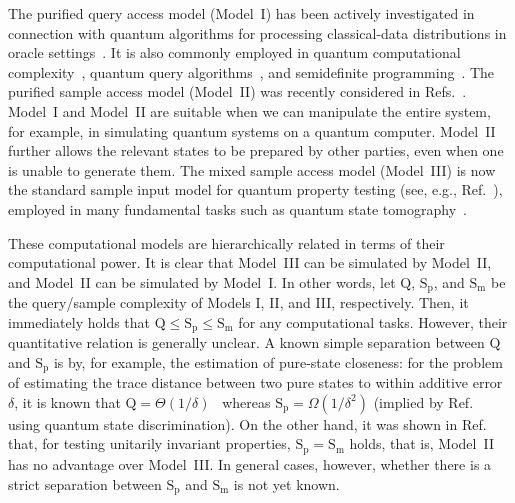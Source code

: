 The purified query access model (Model~I) has been actively investigated in connection with quantum algorithms for processing classical-data distributions in oracle settings~\cite{belovs2019ClassicalDist, gilyen2019DistPropTesting, luo2024SuccinctTest}.
It is also commonly employed in quantum computational complexity~\cite{watrous2002limitQSZK, watrous2009QSZKquantumattacks}, quantum query algorithms~\cite{gilyen2022improvedfidelity, Apeldoorn2023TomoPurifQuery}, and semidefinite programming~\cite{brandao2019SDPOpt, vanapeldoorn2019impleveSDP}. 
The purified sample access model (Model~II) was recently considered in Refs.~\cite{chen2024localtestUniInv, liu2024exponentialseparations}.
Model~I and Model~II are suitable when we can manipulate the entire system, for example, in simulating quantum systems on a quantum computer.
Model~II further allows the relevant states to be prepared by other parties, even when one is unable to generate them. 
The mixed sample access model (Model~III) is now the standard sample input model for quantum property testing (see, e.g., Ref.~\cite{MdW16surveyquantproptest}), employed in many fundamental tasks such as quantum state tomography~\cite{ODonnell2016EffTomo, Haah2017samploptTomo, Guta2020FastTomo, Chen2023WhenAdapTomo, hu2024sampleoptimalmemoryefficient}. 


These computational models are hierarchically related in terms of their computational power.
It is clear that Model~III can be simulated by Model~II, and Model~II can be simulated by Model~I. 
In other words, let $\mathrm{Q}$, $\mathrm{S}_{\mathrm{p}}$, and $\mathrm{S}_{\mathrm{m}}$ be the query/sample complexity of Models I, II, and III, respectively. 
Then, it immediately holds that $\mathrm{Q} \leq \mathrm{S}_{\mathrm{p}} \leq \mathrm{S}_{\mathrm{m}}$ for any computational tasks. 
However, their quantitative relation is generally unclear. 
A known simple separation between $\mathrm{Q}$ and $\mathrm{S}_{\mathrm{p}}$ is by, for example, the estimation of pure-state closeness: for the problem of estimating the trace distance between two pure states to within additive error $\delta$, it is known that $\mathrm{Q} = \Theta(1/\delta)$~\cite{Wang2024OptimalFidelityPure,Fang2025OptimalFidelityToPure} whereas $\mathrm{S}_{\mathrm{p}} = \Omega(1/\delta^2)$ (implied by Ref.~\cite{ALL22} using quantum state discrimination). 
On the other hand, it was shown in Ref.~\cite{chen2024localtestUniInv} that, for testing unitarily invariant properties, $\mathrm{S_p} = \mathrm{S_m}$ holds, that is, Model~II has no advantage over Model~III.
In general cases, however, whether there is a strict separation between $\mathrm{S}_{\mathrm{p}}$ and $\mathrm{S}_{\mathrm{m}}$ is not yet known.

